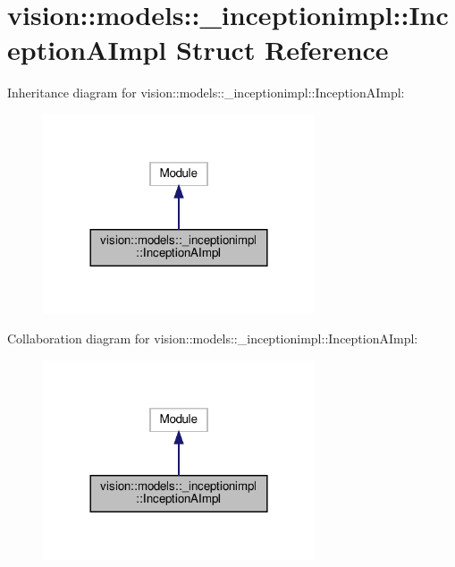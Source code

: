 \hypertarget{structvision_1_1models_1_1__inceptionimpl_1_1InceptionAImpl}{}\section{vision\+:\+:models\+:\+:\+\_\+inceptionimpl\+:\+:Inception\+A\+Impl Struct Reference}
\label{structvision_1_1models_1_1__inceptionimpl_1_1InceptionAImpl}


Inheritance diagram for vision\+:\+:models\+:\+:\+\_\+inceptionimpl\+:\+:Inception\+A\+Impl\+:
\nopagebreak
\begin{figure}[H]
\begin{center}
\leavevmode
\includegraphics[width=228pt]{structvision_1_1models_1_1__inceptionimpl_1_1InceptionAImpl__inherit__graph}
\end{center}
\end{figure}


Collaboration diagram for vision\+:\+:models\+:\+:\+\_\+inceptionimpl\+:\+:Inception\+A\+Impl\+:
\nopagebreak
\begin{figure}[H]
\begin{center}
\leavevmode
\includegraphics[width=228pt]{structvision_1_1models_1_1__inceptionimpl_1_1InceptionAImpl__coll__graph}
\end{center}
\end{figure}
